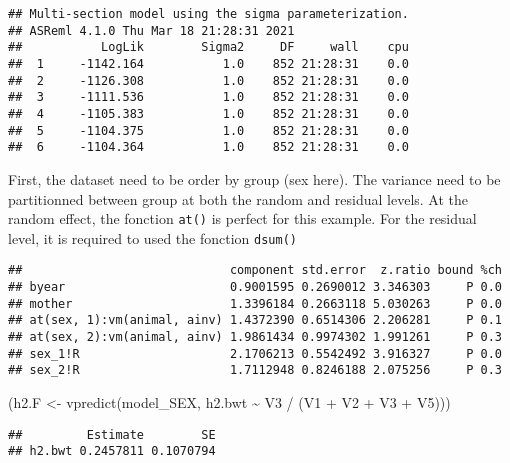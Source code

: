 \documentclass[
  12pt,
]{book}
\newenvironment{Shaded}{\begin{snugshade}}{\end{snugshade}}
\newcommand{\FunctionTok}[1]{\textcolor[rgb]{0.00,0.00,0.00}{#1}}
\newcommand{\NormalTok}[1]{#1}
\newcommand{\OtherTok}[1]{\textcolor[rgb]{0.56,0.35,0.01}{#1}}
\newcommand{\SpecialCharTok}[1]{\textcolor[rgb]{0.00,0.00,0.00}{#1}}
\begin{document}
\begin{verbatim}
## Multi-section model using the sigma parameterization.
## ASReml 4.1.0 Thu Mar 18 21:28:31 2021
##           LogLik        Sigma2     DF     wall    cpu
##  1     -1142.164           1.0    852 21:28:31    0.0
##  2     -1126.308           1.0    852 21:28:31    0.0
##  3     -1111.536           1.0    852 21:28:31    0.0
##  4     -1105.383           1.0    852 21:28:31    0.0
##  5     -1104.375           1.0    852 21:28:31    0.0
##  6     -1104.364           1.0    852 21:28:31    0.0
\end{verbatim}

First, the dataset need to be order by group (sex here). The variance need to be partitionned between group at both the random and residual levels. At the random effect, the fonction \texttt{at()} is perfect for this example. For the residual level, it is required to used the fonction \texttt{dsum()}

\begin{Shaded}
\end{Shaded}

\begin{verbatim}
##                             component std.error  z.ratio bound %ch
## byear                       0.9001595 0.2690012 3.346303     P 0.0
## mother                      1.3396184 0.2663118 5.030263     P 0.0
## at(sex, 1):vm(animal, ainv) 1.4372390 0.6514306 2.206281     P 0.1
## at(sex, 2):vm(animal, ainv) 1.9861434 0.9974302 1.991261     P 0.3
## sex_1!R                     2.1706213 0.5542492 3.916327     P 0.0
## sex_2!R                     1.7112948 0.8246188 2.075256     P 0.3
\end{verbatim}

\begin{Shaded}
\begin{Highlighting}[]
\NormalTok{(h2.F }\OtherTok{\textless{}{-}} \FunctionTok{vpredict}\NormalTok{(model\_SEX, h2.bwt }\SpecialCharTok{\textasciitilde{}}\NormalTok{ V3 }\SpecialCharTok{/}\NormalTok{ (V1 }\SpecialCharTok{+}\NormalTok{ V2 }\SpecialCharTok{+}\NormalTok{ V3 }\SpecialCharTok{+}\NormalTok{ V5)))}
\end{Highlighting}
\end{Shaded}

\begin{verbatim}
##         Estimate        SE
## h2.bwt 0.2457811 0.1070794
\end{verbatim}
\end{document}
